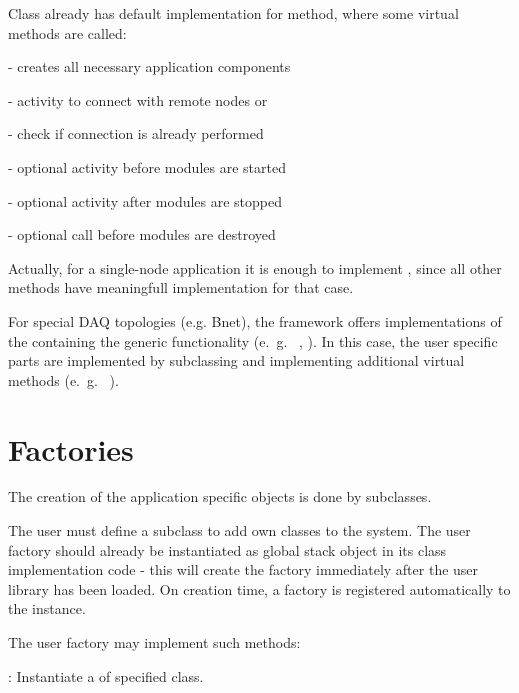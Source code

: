 Class  already has default implementation for
 method, where some virtual methods are called:

\bdes
\item[\func{CreateAppModules()}] - creates all necessary application components
\item[\func{ConnectAppModules()}] - activity to connect with remote nodes or  
\item[\func{IsAppModulesConnected()}] - check if connection is already performed  
\item[\func{BeforeAppModulesStarted()}] - optional activity before modules are started 
\item[\func{AfterAppModulesStopped()}] - optional activity after modules are stopped
\item[\func{BeforeAppModulesDestroyed()}] - optional call before modules are destroyed
\edes

Actually, for a single-node application it is enough to implement ,
since all other methods have meaningfull implementation for that case. 

For special DAQ topologies (e.g. Bnet), the framework offers 
implementations of the  containing the 
generic functionality (e.~g.~ , ). 
In this case, the user specific parts are implemented by subclassing 
and implementing additional virtual methods (e.~g.~ ).    



\section{Factories}
\label{prog_plugin_factory}

The creation of the application specific objects is done by  subclasses.

The user must define a  
subclass to add own classes to the system.
The user factory should already be instantiated as global stack object
in its class implementation code -
this will create  the factory immediately after the user library has been loaded. 
On creation time, a factory is registered automatically to the  
instance.

The user factory may implement such methods:
\bdes
	\item [\func{CreateModule()}] : 
	Instantiate a  of specified class. 
	
